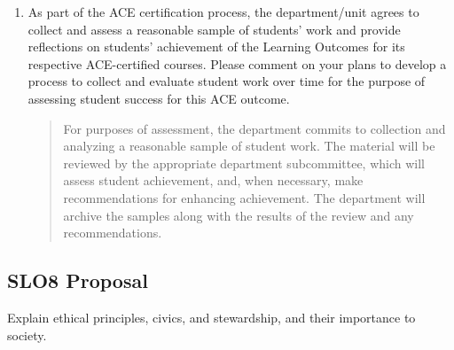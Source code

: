 \documentclass[11pt]{article}
\begin{document}
\begin{enumerate}
\item As part of the ACE certification process, the department/unit agrees to collect and assess a reasonable sample of students’ work and provide reflections on students’ achievement of the Learning Outcomes for its respective ACE-certified courses. Please comment on your plans to develop a process to collect and evaluate student work over time for the purpose of assessing student success for this ACE outcome.

\begin{quote}
For purposes of assessment, the department commits to collection and analyzing a reasonable sample of student work. The material will be reviewed by the appropriate department subcommittee, which will assess student achievement, and, when necessary, make recommendations for enhancing achievement. The department will archive the samples along with the results of the review and any recommendations.
\end{quote}
\end{enumerate}

\subsection*{SLO8 Proposal}
\label{sec-2-2}
Explain ethical principles, civics, and stewardship, and their importance to
society. 
\end{document}
